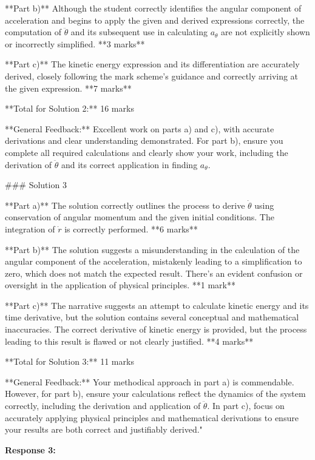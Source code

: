 \documentclass[a4paper,11pt]{article}
\begin{document}
**Part b)** Although the student correctly identifies the angular component of acceleration and begins to apply the given and derived expressions correctly, the computation of \( \ddot{\theta} \) and its subsequent use in calculating \( a_{\theta} \) are not explicitly shown or incorrectly simplified. **3 marks**

**Part c)** The kinetic energy expression and its differentiation are accurately derived, closely following the mark scheme's guidance and correctly arriving at the given expression. **7 marks**

**Total for Solution 2:** 16 marks

**General Feedback:** Excellent work on parts a) and c), with accurate derivations and clear understanding demonstrated. For part b), ensure you complete all required calculations and clearly show your work, including the derivation of \( \ddot{\theta} \) and its correct application in finding \( a_{\theta} \).

### Solution 3

**Part a)** The solution correctly outlines the process to derive \( \dot{\theta} \) using conservation of angular momentum and the given initial conditions. The integration of \( \dot{r} \) is correctly performed. **6 marks**

**Part b)** The solution suggests a misunderstanding in the calculation of the angular component of the acceleration, mistakenly leading to a simplification to zero, which does not match the expected result. There's an evident confusion or oversight in the application of physical principles. **1 mark**

**Part c)** The narrative suggests an attempt to calculate kinetic energy and its time derivative, but the solution contains several conceptual and mathematical inaccuracies. The correct derivative of kinetic energy is provided, but the process leading to this result is flawed or not clearly justified. **4 marks**

**Total for Solution 3:** 11 marks

**General Feedback:** Your methodical approach in part a) is commendable. However, for part b), ensure your calculations reflect the dynamics of the system correctly, including the derivation and application of \( \ddot{\theta} \). In part c), focus on accurately applying physical principles and mathematical derivations to ensure your results are both correct and justifiably derived."

\textbf{Response 3:}
\end{document}
